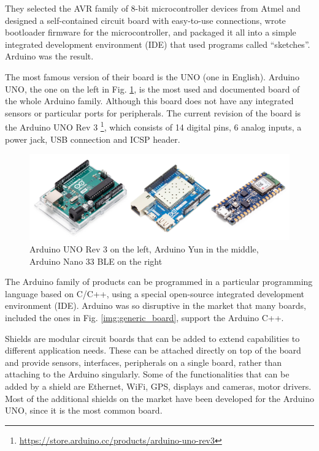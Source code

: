 		They selected the AVR family of 8-bit microcontroller devices from Atmel and designed a self-contained circuit board with easy-to-use connections, wrote bootloader firmware for the microcontroller, and packaged it all into a simple integrated development environment (IDE) that used programs called “sketches”. 
		Arduino was the result.
		
		The most famous version of their board is the UNO (one in English).
		Arduino UNO, the one on the left in Fig. \ref{img:arduino_board}, is the most used and documented board of the whole Arduino family.
		Although this board does not have any integrated sensors or particular ports for peripherals.
		The current revision of the board is the Arduino UNO Rev 3 \footnote{\url{https://store.arduino.cc/products/arduino-uno-rev3}}, which consists of 14 digital pins, 6 analog inputs, a power jack, USB connection and ICSP header.
		
		\begin{figure}[H]
			\centering
			\includegraphics[width=\textwidth]{resources/img/chap3/arduino_types}
			\caption{Arduino UNO Rev 3 on the left, Arduino Yun in the middle, Arduino Nano 33 BLE on the right}
			\label{img:arduino_board}
		\end{figure}
		
		The Arduino family of products can be programmed in a particular programming language based on C/C++, using a special open-source integrated development environment (IDE).
		Arduino was so disruptive in the market that many boards, included the ones in Fig. \ref{img:generic_board}, support the Arduino C++.

		Shields are modular circuit boards that can be added to extend capabilities to different application needs.
		These can be attached directly on top of the board and provide sensors, interfaces, peripherals on a single board, rather than attaching to the Arduino singularly.
		Some of the functionalities that can be added by a shield are Ethernet, WiFi, GPS, displays and cameras, motor drivers.
		Most of the additional shields on the market have been developed for the Arduino UNO, since it is the most common board.
		

